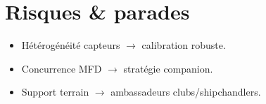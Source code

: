 \documentclass[12pt,a4paper]{article}
\begin{document}
\section{Risques \& parades}
\begin{itemize}
  \item Hétérogénéité capteurs $\rightarrow$ calibration robuste.
  \item Concurrence MFD $\rightarrow$ stratégie companion.
  \item Support terrain $\rightarrow$ ambassadeurs clubs/shipchandlers.
\end{itemize}
\end{document}
